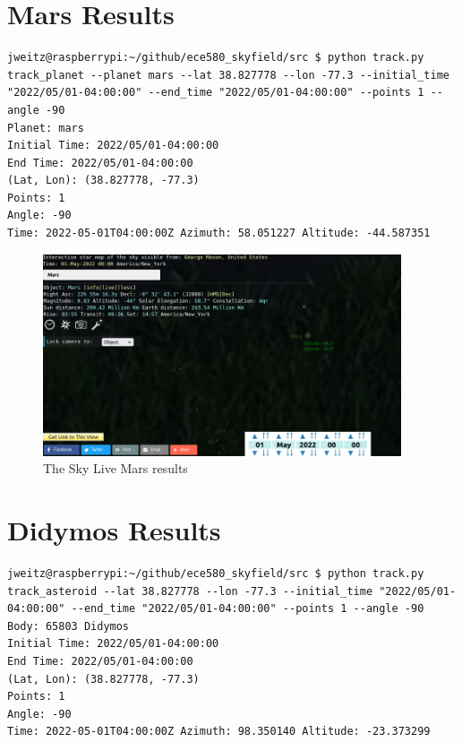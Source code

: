 \documentclass[../main.tex]{subfiles}
\begin{document}
\section{Mars Results}

\begin{lstlisting}
jweitz@raspberrypi:~/github/ece580_skyfield/src $ python track.py track_planet --planet mars --lat 38.827778 --lon -77.3 --initial_time "2022/05/01-04:00:00" --end_time "2022/05/01-04:00:00" --points 1 --angle -90
Planet: mars
Initial Time: 2022/05/01-04:00:00
End Time: 2022/05/01-04:00:00
(Lat, Lon): (38.827778, -77.3)
Points: 1
Angle: -90
Time: 2022-05-01T04:00:00Z Azimuth: 58.051227 Altitude: -44.587351
\end{lstlisting}

\begin{figure}[H]
    \centering
    \includegraphics[width=300pt]{components/photos/mars_crop.png}
    \caption{The Sky Live Mars results}
    \label{fig:skylive_mars}
\end{figure}

\section{Didymos Results}

\begin{lstlisting}
jweitz@raspberrypi:~/github/ece580_skyfield/src $ python track.py track_asteroid --lat 38.827778 --lon -77.3 --initial_time "2022/05/01-04:00:00" --end_time "2022/05/01-04:00:00" --points 1 --angle -90                                                                                                                                        
Body: 65803 Didymos
Initial Time: 2022/05/01-04:00:00
End Time: 2022/05/01-04:00:00
(Lat, Lon): (38.827778, -77.3)
Points: 1
Angle: -90
Time: 2022-05-01T04:00:00Z Azimuth: 98.350140 Altitude: -23.373299
\end{lstlisting}
\end{document}
